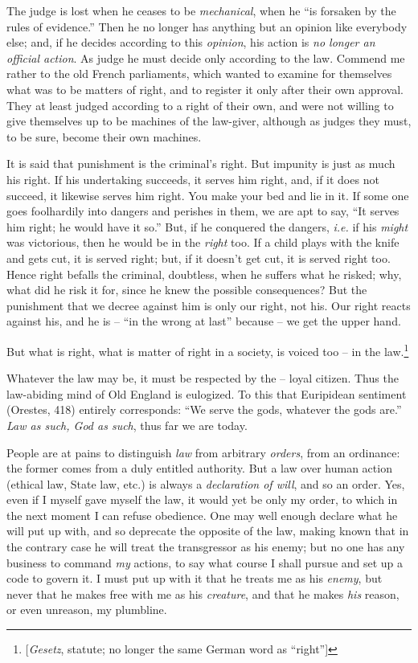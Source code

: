 The judge is lost when he ceases to be \textit{mechanical}, when he ``is 
forsaken by the rules of evidence.'' Then he no longer has anything but an 
opinion like everybody else; and, if he decides according to this 
\textit{opinion}, his action is \textit{no longer an official action}. As 
judge he must decide only according to the law. Commend me rather to the old 
French parliaments, which wanted to examine for themselves what was to be 
matters of right, and to register it only after their own approval. They at 
least judged according to a right of their own, and were not willing to give 
themselves up to be machines of the law-giver, although as judges they must, 
to be sure, become their own machines.

It is said that punishment is the criminal's right. But impunity is just as 
much his right. If his undertaking succeeds, it serves him right, and, if it 
does not succeed, it likewise serves him right. You make your bed and lie in 
it. If some one goes foolhardily into dangers and perishes in them, we are apt 
to say, ``It serves him right; he would have it so.'' But, if he conquered 
the dangers, \textit{i.e.} if his \textit{might} was victorious, then he would 
be in the \textit{right} too. If a child plays with the knife and gets cut, it 
is served right; but, if it doesn't get cut, it is served right too. Hence 
right befalls the criminal, doubtless, when he suffers what he risked; why, 
what did he risk it for, since he knew the possible consequences? But the 
punishment that we decree against him is only our right, not his. Our right 
reacts against his, and he is -- ``in the wrong at last'' because -- we get 
the upper hand.

\myhrule


But what is right, what is matter of right in a society, is voiced too -- in 
the law.\footnote{[\textit{Gesetz}, statute; no longer the same German word as 
``right'']}

Whatever the law may be, it must be respected by the -- loyal citizen. Thus 
the law-abiding mind of Old England is eulogized. To this that Euripidean 
sentiment (Orestes, 418) entirely corresponds: ``We serve the gods, whatever 
the gods are.'' \textit{Law as such, God as such}, thus far we are today.

People are at pains to distinguish \textit{law} from arbitrary \textit{orders}, 
from an ordinance: the former comes from a duly entitled authority. But a law 
over human action (ethical law, State law, etc.) is always a 
\textit{declaration of will}, and so an order. Yes, even if I myself gave 
myself the law, it would yet be only my order, to which in the next moment I 
can refuse obedience. One may well enough declare what he will put up with, 
and so deprecate the opposite of the law, making known that in the contrary 
case he will treat the transgressor as his enemy; but no one has any business 
to command \textit{my} actions, to say what course I shall pursue and set up a 
code to govern it. I must put up with it that he treats me as his 
\textit{enemy}, but never that he makes free with me as his \textit{creature}, 
and that he makes \textit{his} reason, or even unreason, my plumbline.

